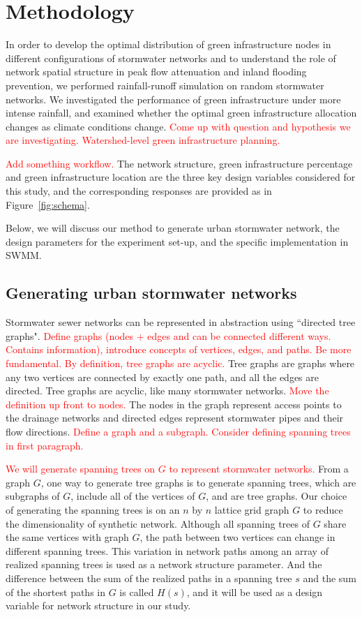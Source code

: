 \documentclass[draft]{agujournal2019}
\begin{document}
\section{Methodology}
In order to develop the optimal distribution of green infrastructure nodes in different configurations of stormwater networks and to understand the role of network spatial structure in peak flow attenuation and inland flooding prevention, we performed rainfall-runoff simulation on random stormwater networks. We investigated the performance of green infrastructure under more intense rainfall, and examined whether the optimal green infrastructure allocation changes as climate conditions change. \textcolor{red}{Come up with question and hypothesis we are investigating. Watershed-level green infrastructure planning.}

\textcolor{red}{Add something workflow.}
The network structure, green infrastructure percentage and green infrastructure location are the three key design variables considered for this study, and the corresponding responses are provided as in Figure~\ref{fig:schema}. 

Below, we will discuss our method to generate urban stormwater network, the design parameters for the experiment set-up, and the specific implementation in SWMM. 

\subsection{Generating urban stormwater networks}
Stormwater sewer networks can be represented in abstraction using ``directed tree graphs". \textcolor{red}{Define graphs (nodes + edges and can be connected different ways. Contains information), introduce concepts of vertices, edges, and paths. Be more fundamental. By definition, tree graphs are acyclic. } Tree graphs are graphs where any two vertices are connected by exactly one path, and all the edges are directed. Tree graphs are acyclic, like many stormwater networks. \textcolor{red}{Move the definition up front to nodes.} The nodes in the graph represent access points to the drainage networks and directed edges represent stormwater pipes and their flow directions. \textcolor{red}{Define a graph and a subgraph. Consider defining spanning trees in first paragraph.}  

\textcolor{red}{We will generate spanning trees on $G$ to represent stormwater networks.} From a graph $G$, one way to generate tree graphs is to generate spanning trees, which are subgraphs of $G$, include all of the vertices of $G$, and are tree graphs. Our choice of generating the spanning trees is on an $n$ by $n$ lattice grid graph $G$ to reduce the dimensionality of synthetic network. Although all spanning trees of $G$ share the same vertices with graph $G$, the path between two vertices can change in different spanning trees. This variation in network paths among an array of realized spanning trees is used as a network structure parameter. And the difference between the sum of the realized paths in a spanning tree $s$ and the sum of the shortest paths in $G$ is called $H(s)$, and it will be used as a design variable for network structure in our study. 
\end{document}
